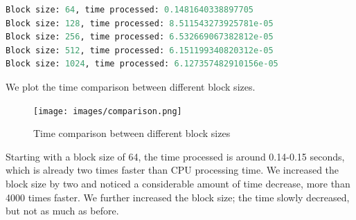 \documentclass[12pt]{article}
\begin{document}
\begin{lstlisting}[language=Python]
Block size: 64, time processed: 0.1481640338897705
Block size: 128, time processed: 8.511543273925781e-05
Block size: 256, time processed: 6.532669067382812e-05
Block size: 512, time processed: 6.151199340820312e-05
Block size: 1024, time processed: 6.127357482910156e-05
\end{lstlisting}

\noindent
We plot the time comparison between different block sizes. 

\begin{figure}[H]
\centering
    \texttt{[image: images/comparison.png]}
    \caption{Time comparison between different block sizes}
\end{figure}

\noindent
Starting with a block size of 64, the time processed is around 0.14-0.15 seconds, which is already two times faster than CPU processing time. We increased the block size by two and noticed a considerable amount of time decrease, more than 4000 times faster. We further increased the block size; the time slowly decreased, but not as much as before. 
\end{document}
